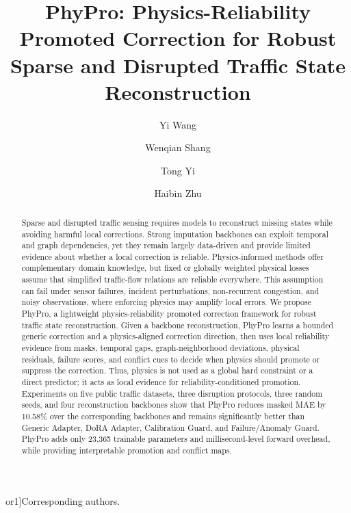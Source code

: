 \documentclass[preprint,12pt]{elsarticle}
\def\corref#1{}%
\def\cortext#1#2{}%
\begin{document}
\begin{frontmatter}

\title{PhyPro: Physics-Reliability Promoted Correction for Robust Sparse and Disrupted Traffic State Reconstruction}

\author[a]{Yi Wang}
\author[b]{Wenqian Shang\corref{cor1}}
\author[c]{Tong Yi\corref{cor1}}
\author[d]{Haibin Zhu}
\cortext[cor1]{Corresponding authors.}


\begin{abstract}
\noindent Sparse and disrupted traffic sensing requires models to reconstruct missing states while avoiding harmful local corrections. Strong imputation backbones can exploit temporal and graph dependencies, yet they remain largely data-driven and provide limited evidence about whether a local correction is reliable. Physics-informed methods offer complementary domain knowledge, but fixed or globally weighted physical losses assume that simplified traffic-flow relations are reliable everywhere. This assumption can fail under sensor failures, incident perturbations, non-recurrent congestion, and noisy observations, where enforcing physics may amplify local errors. We propose PhyPro, a lightweight physics-reliability promoted correction framework for robust traffic state reconstruction. Given a backbone reconstruction, PhyPro learns a bounded generic correction and a physics-aligned correction direction, then uses local reliability evidence from masks, temporal gaps, graph-neighborhood deviations, physical residuals, failure scores, and conflict cues to decide when physics should promote or suppress the correction. Thus, physics is not used as a global hard constraint or a direct predictor; it acts as local evidence for reliability-conditioned promotion. Experiments on five public traffic datasets, three disruption protocols, three random seeds, and four reconstruction backbones show that PhyPro reduces masked MAE by 10.58\% over the corresponding backbones and remains significantly better than Generic Adapter, DoRA Adapter, Calibration Guard, and Failure/Anomaly Guard. PhyPro adds only 23,365 trainable parameters and millisecond-level forward overhead, while providing interpretable promotion and conflict maps.




\end{abstract}
\end{frontmatter}
\end{document}
